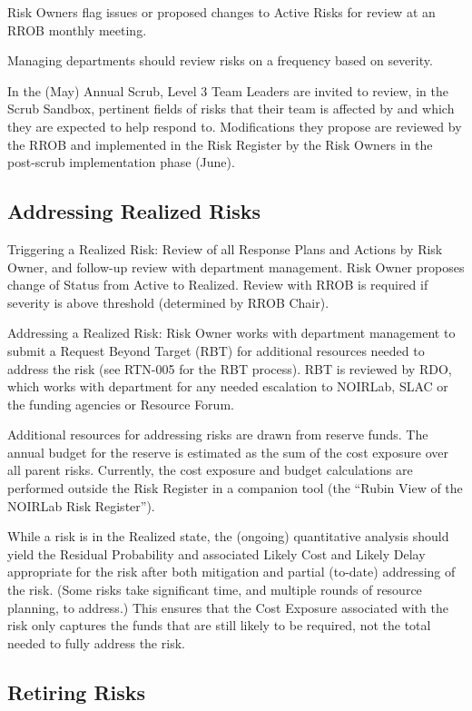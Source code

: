 Risk Owners flag issues or proposed changes to Active Risks for review at an RROB monthly meeting.

Managing departments should review risks on a frequency based on severity.

In the (May) Annual Scrub, Level 3 Team Leaders are invited to review, in the Scrub Sandbox, pertinent fields of risks that their team is affected by and which they are expected to help respond to.
Modifications they propose are reviewed by the RROB and implemented in the Risk Register by the Risk Owners in the post-scrub implementation phase (June).

\subsection{Addressing Realized Risks}

Triggering a Realized Risk:
Review of all Response Plans and Actions by Risk Owner, and follow-up review with department management.
Risk Owner proposes change of Status from Active to Realized.
Review with RROB is required if severity is above threshold (determined by RROB Chair).

Addressing a Realized Risk:
Risk Owner works with department management to submit a Request Beyond Target (RBT) for additional resources needed to address the risk (see RTN-005 for the RBT process).
RBT is reviewed by RDO, which works with department for any needed escalation to NOIRLab, SLAC or the funding agencies or Resource Forum.

Additional resources for addressing risks are drawn from reserve funds.
The annual budget for the reserve is estimated as the sum of the cost exposure over all parent risks.
Currently, the cost exposure and budget calculations are performed outside the Risk Register in a companion tool (the ``Rubin View of the NOIRLab Risk Register'').

While a risk is in the Realized state, the (ongoing) quantitative analysis should yield the Residual Probability and associated Likely Cost and Likely Delay appropriate for the risk after both mitigation and partial (to-date) addressing of the risk.
(Some risks take significant time, and multiple rounds of resource planning, to address.)
This ensures that the Cost Exposure associated with the risk only captures the funds that are still likely to be required, not the total needed to fully address the risk.

\subsection{Retiring Risks}

